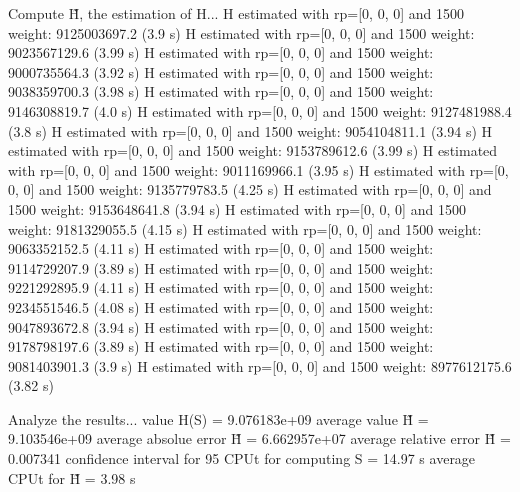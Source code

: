 Compute H̃, the estimation of H...
  H estimated with rp=[0, 0, 0] and 1500 weight:  9125003697.2  (3.9 s)
  H estimated with rp=[0, 0, 0] and 1500 weight:  9023567129.6  (3.99 s)
  H estimated with rp=[0, 0, 0] and 1500 weight:  9000735564.3  (3.92 s)
  H estimated with rp=[0, 0, 0] and 1500 weight:  9038359700.3  (3.98 s)
  H estimated with rp=[0, 0, 0] and 1500 weight:  9146308819.7  (4.0 s)
  H estimated with rp=[0, 0, 0] and 1500 weight:  9127481988.4  (3.8 s)
  H estimated with rp=[0, 0, 0] and 1500 weight:  9054104811.1  (3.94 s)
  H estimated with rp=[0, 0, 0] and 1500 weight:  9153789612.6  (3.99 s)
  H estimated with rp=[0, 0, 0] and 1500 weight:  9011169966.1  (3.95 s)
  H estimated with rp=[0, 0, 0] and 1500 weight:  9135779783.5  (4.25 s)
  H estimated with rp=[0, 0, 0] and 1500 weight:  9153648641.8  (3.94 s)
  H estimated with rp=[0, 0, 0] and 1500 weight:  9181329055.5  (4.15 s)
  H estimated with rp=[0, 0, 0] and 1500 weight:  9063352152.5  (4.11 s)
  H estimated with rp=[0, 0, 0] and 1500 weight:  9114729207.9  (3.89 s)
  H estimated with rp=[0, 0, 0] and 1500 weight:  9221292895.9  (4.11 s)
  H estimated with rp=[0, 0, 0] and 1500 weight:  9234551546.5  (4.08 s)
  H estimated with rp=[0, 0, 0] and 1500 weight:  9047893672.8  (3.94 s)
  H estimated with rp=[0, 0, 0] and 1500 weight:  9178798197.6  (3.89 s)
  H estimated with rp=[0, 0, 0] and 1500 weight:  9081403901.3  (3.9 s)
  H estimated with rp=[0, 0, 0] and 1500 weight:  8977612175.6  (3.82 s)

Analyze the results...
  value H(S)                  = 9.076183e+09 
  average value H̃             = 9.103546e+09 
  average absolue error H̃     = 6.662957e+07 
  average relative error H̃    = 0.007341 
  confidence interval for 95%
  CPUt for computing S         = 14.97 s
  average CPUt for H̃           = 3.98 s

